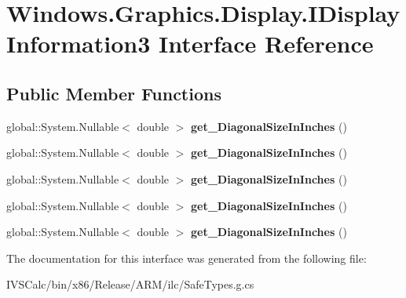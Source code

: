 \hypertarget{interface_windows_1_1_graphics_1_1_display_1_1_i_display_information3}{}\section{Windows.\+Graphics.\+Display.\+I\+Display\+Information3 Interface Reference}
\label{interface_windows_1_1_graphics_1_1_display_1_1_i_display_information3}
\subsection*{Public Member Functions}
\begin{DoxyCompactItemize}
\item 
\mbox{\label{interface_windows_1_1_graphics_1_1_display_1_1_i_display_information3_a221e2bcd944e36ae69e598234913d8dd}} 
global\+::\+System.\+Nullable$<$ double $>$ {\bfseries get\+\_\+\+Diagonal\+Size\+In\+Inches} ()
\item 
\mbox{\label{interface_windows_1_1_graphics_1_1_display_1_1_i_display_information3_a221e2bcd944e36ae69e598234913d8dd}} 
global\+::\+System.\+Nullable$<$ double $>$ {\bfseries get\+\_\+\+Diagonal\+Size\+In\+Inches} ()
\item 
\mbox{\label{interface_windows_1_1_graphics_1_1_display_1_1_i_display_information3_a221e2bcd944e36ae69e598234913d8dd}} 
global\+::\+System.\+Nullable$<$ double $>$ {\bfseries get\+\_\+\+Diagonal\+Size\+In\+Inches} ()
\item 
\mbox{\label{interface_windows_1_1_graphics_1_1_display_1_1_i_display_information3_a221e2bcd944e36ae69e598234913d8dd}} 
global\+::\+System.\+Nullable$<$ double $>$ {\bfseries get\+\_\+\+Diagonal\+Size\+In\+Inches} ()
\item 
\mbox{\label{interface_windows_1_1_graphics_1_1_display_1_1_i_display_information3_a221e2bcd944e36ae69e598234913d8dd}} 
global\+::\+System.\+Nullable$<$ double $>$ {\bfseries get\+\_\+\+Diagonal\+Size\+In\+Inches} ()
\end{DoxyCompactItemize}


The documentation for this interface was generated from the following file\+:\begin{DoxyCompactItemize}
\item 
I\+V\+S\+Calc/bin/x86/\+Release/\+A\+R\+M/ilc/Safe\+Types.\+g.\+cs\end{DoxyCompactItemize}
